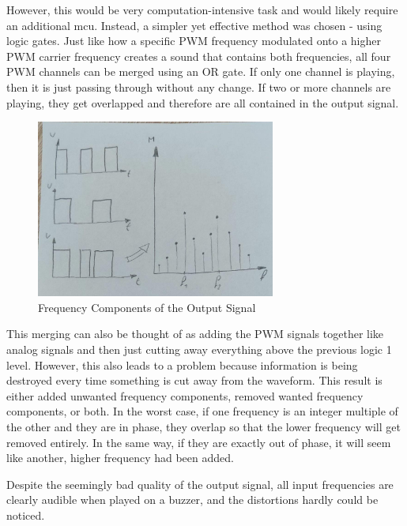 However, this would be very computation-intensive task and would likely require an additional \gls{mcu}. Instead, a simpler yet effective method was chosen - using logic gates. Just like how a specific PWM frequency modulated onto a higher PWM carrier frequency creates a sound that contains both frequencies, all four PWM channels can be merged using an OR gate. If only one channel is playing, then it is just passing through without any change. If two or more channels are playing, they get overlapped and therefore are all contained in the output signal. 

\begin{figure}[h!]
    \centering
    \includegraphics[width=0.7\textwidth]{felix/resources/signalCombinationFourier.jpg}
    \caption{Frequency Components of the Output Signal}
    \label{fig:signal-combination-fourier}
\end{figure}

This merging can also be thought of as adding the PWM signals together like analog signals and then just cutting away everything above the previous logic 1 level. However, this also leads to a problem because information is being destroyed every time something is cut away from the waveform. This result is either added unwanted frequency components, removed wanted frequency components, or both. In the worst case, if one frequency is an integer multiple of the other and they are in phase, they overlap so that the lower frequency will get removed entirely. In the same way, if they are exactly out of phase, it will seem like another, higher frequency had been added.


Despite the seemingly bad quality of the output signal, all input frequencies are clearly audible when played on a buzzer, and the distortions hardly could be noticed.